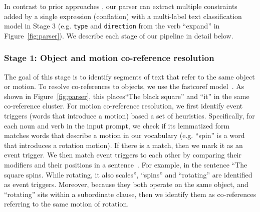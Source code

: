 In contrast to prior approaches , our parser can extract multiple
constraints added by a single expression (conflation) with a
multi-label text classification model in Stage 3 (e.g. \texttt{type}
and \texttt{direction} from the verb ``expand'' in
Figure~\ref{fig:parser}).  We describe each stage of our pipeline in
detail below. 

\subsubsection{Stage 1: Object and motion co-reference resolution}
The goal of this stage is to identify segments of text that refer to
the same object or motion.
%
To resolve co-references to objects, we use the fastcoref
model~\cite{otmazgin2022fastcoref}.  As shown in
Figure~\ref{fig:parser}, this places``The black square'' and
``it'' in the same co-reference cluster.
%
For motion co-reference resolution, we first identify event triggers
(words that introduce a motion) based a set of heuristics.
Specifically, for each noun and verb in the input prompt, we check if
its lemmatized form matches words that describe a motion in our
vocabulary (e.g. ``spin'' is a word that introduces a rotation
motion).   If there is a match, then
we mark it as an event trigger.  We then match event triggers to each
other by comparing their modifiers and their positions in a
sentence~\cite{ahmed2023lemmamatching, kenyondean2018lemmaheuristic}.
For example, in the sentence ``The square spins. While rotating, it
also scales'', ``spins'' and ``rotating'' are identified as event
triggers.  Moreover, because they both operate on the same object, and
``rotating'' sits within a subordinate clause, then we identify them
as co-references referring to the same motion of rotation.

